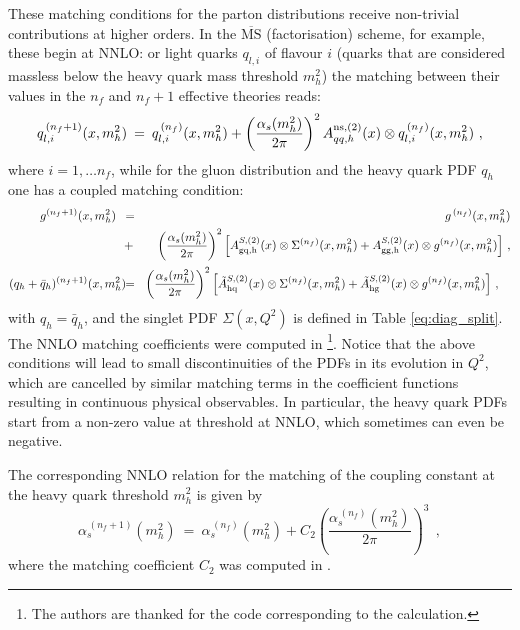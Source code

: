 \documentclass[12pt]{article}
\newcommand{\be}{\begin{equation}}
\newcommand{\ee}{\end{equation}}
\newcommand{\bea}{\begin{eqnarray}}
\newcommand{\eea}{\end{eqnarray}}
\newcommand{\lp}{\left(}
\newcommand{\rp}{\right)}
\newcommand{\nf}{n_f)}
\newcommand{\nn}{\nonumber}
\newcommand{\as}{\alpha_s}
\newcommand{\MSbar}{\overline{\mathrm{MS}}}
\begin{document}
These matching conditions for the parton distributions
receive non-trivial contributions at higher orders. In the $\MSbar$
(factorisation) scheme, for example, these begin at NNLO:
or light quarks $q_{l,i}$ of flavour $i$ 
(quarks that are considered massless
below the heavy quark mass threshold $m_h^2$) the matching between
their values in the $n_f$ and
$n_f+1$ effective theories reads:
\be
\label{eq:lp-nf1}
  q_{l,i}^{\,(n_f+1)}(x,m_h^2) \: = \:  q_{l,i}^{\,(\nf}(x,m_h^2) +
\lp \frac{\alpha_s(m_h^2)}{2\pi} \rp^2
   A^{\rm ns,(2)}_{qq,h}(x) \otimes
  q_{l,i}^{\, (\nf}(x,m_h^2) \ ,
\ee
where  $i = 1,\ldots n_f$, while for the gluon
distribution and the heavy quark PDF $q_h$ one has a coupled matching 
condition:
\bea
\label{eq:hp-nf1}
  g^{(n_f+1)}(x,m_h^2) \:\:\: &\! = \!\! &
    g^{\, (\nf}(x,m_h^2) 
\\ &+& \lp \frac{\alpha_s(m_h^2)}{2\pi} \rp^2 \Big[
    A_{\rm gq,h}^{S,(2)}(x) \otimes \Sigma^{(\nf}(x,m_h^2) +
    A_{\rm gg,h}^{S,(2)}(x) \otimes g^{(\nf}(x,m_h^2) \Big ]\ ,
  \nn \\[0.5mm] 
  (q_h+\bar{q}_{h})^{(n_f+1)}(x,m_h^2) \! &\! =\!\! &
   \lp \frac{\alpha_s(m_h^2)}{2\pi} \rp^2 \Big [
    \tilde{A}_{\rm hq}^{S,(2)}(x)\otimes \Sigma^{(\nf}(x,m_h^2) 
    + \tilde{A}_{\rm hg}^{S,(2)}(x)\otimes g^{(\nf}(x,m_h^2) \Big  ] \ ,
  \quad \nonumber
\eea
with $q_h=\bar{q}_h$, and the singlet PDF $\Sigma(x,Q^2)$ is defined
in Table \ref{eq:diag_split}.
The NNLO matching coefficients were
computed in \cite{NNLO-MTM}\footnote{The authors are thanked 
for the code corresponding to the
calculation.}.
Notice that the above conditions will lead to small discontinuities
of the PDFs in its evolution in $Q^2$, 
which are cancelled by similar matching terms
in the coefficient functions resulting in continuous physical
observables. In particular, the heavy quark PDFs start from a non-zero
value at threshold at NNLO, which sometimes can even be
negative.

The corresponding NNLO relation for the matching of the coupling constant 
at the heavy quark threshold $m^2_h$ is given by
\be
\label{eq:as-nf1}
  \as^{\, (n_f+1)}(m_h^2) \: = \:
  \as^{\, (\nf} (m_h^2) +   C_2 \lp \frac{\as^{\, (\nf} (m_h^2)}{2\pi} \rp^3
   \:\: ,
\ee
where the matching coefficient $C_2$ was computed in \cite{Chetyrkin:1997sg}.
\end{document}
